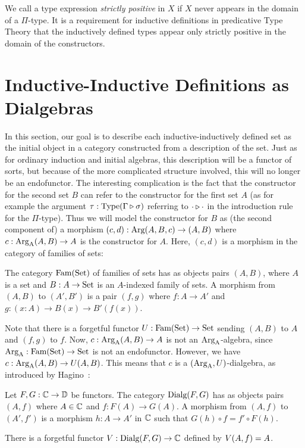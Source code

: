 \documentclass[orivec,envcountsame, ,envcountsect]{llncs}
\begin{document}
We call a type expression \emph{strictly positive} in $X$ if $X$ never
appears in the domain of a $\Pi$-type. It is a requirement for
inductive definitions in predicative Type Theory that the inductively
defined types appear only strictly positive in the domain of the
constructors.

\section{Inductive-Inductive Definitions as Dialgebras}
\label{sec:indind-as-dialg}

 In this section, our goal is to describe each inductive-inductively
 defined set as the initial object in a category constructed from a
 description of the set. Just as for ordinary induction and initial
 algebras, this description will be a functor of sorts, but because of
 the more complicated structure involved, this will no longer be an
 endofunctor.
 The interesting complication is the fact that the
 constructor for the second set $B$ can refer to the constructor for
 the first set $A$ (as for example the argument $\tau :
 \text{Type}(\Gamma \triangleright \sigma)$ referring to
 $\cdot \triangleright \cdot$ in the introduction rule for the
 $\Pi$-type). 
 Thus we will model the constructor for $B$ as (the second component
 of) a morphism $(c, d) : \text{Arg}(A, B, c) \to (A, B)$ where $c :
 \text{Arg}_{\text{A}}(A, B) \to A$ is the constructor for $A$. Here, $(c, d)$ is a
 morphism in the category of families of sets:

\begin{definition}
  The category $\text{Fam}(\text{Set})$ of families of sets has as objects pairs $(A,
  B)$, where $A$ is a set and $B : A \to \text{Set}$ is an $A$-indexed family
  of sets. A morphism from $(A, B)$ to $(A', B')$ is a pair $(f, g)$
  where $f : A \to A'$ and ${g : (x : A) \to B(x) \to B'(f(x))}$.
\end{definition}
Note that there is a forgetful functor $U : \text{Fam}(\text{Set}) \to \text{Set}$
sending $(A, B)$ to $A$ and $(f, g)$ to $f$.
Now, $c : \text{Arg}_{\text{A}}(A, B) \to A$ is not an $\text{Arg}_{\text{A}}$-algebra,
since $\text{Arg}_{\text{A}} : \text{Fam}(\text{Set}) \to \text{Set}$ is not an endofunctor. However, we have $c :
\text{Arg}_{\text{A}}(A, B) \to U(A, B)$. This means that $c$ is a $(\text{Arg}_{\text{A}},
U)$-dialgebra, as introduced by Hagino~\cite{hagino1987phdthesis}:

\begin{definition}
  Let $F, G : \mathbb{C} \to \mathbb{D}$ be functors. The category $\text{Dialg}(F, G)$ has
  as objects pairs $(A, f)$ where $A \in \mathbb{C}$ and $f : F(A) \to
  G(A)$. A morphism from $(A, f)$ to $(A', f')$ is a morphism $h : A
  \to A'$ in $\mathbb{C}$ such that $G(h) \circ f = f' \circ F(h)$.
\end{definition}
There is a forgetful functor $V : \text{Dialg}(F, G) \to \mathbb{C}$
defined by $V(A, f) = A$.
\end{document}
